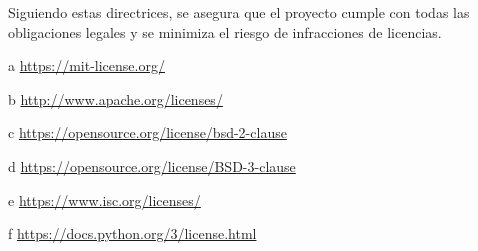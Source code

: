 Siguiendo estas directrices, se asegura que el proyecto cumple con todas las obligaciones legales y se minimiza el riesgo de infracciones de licencias.

\vspace{1cm}

\begin{ThreePartTable}
\renewcommand\TPTminimum{\textwidth}
\begin{TableNotes}
\footnotesize %
    \item[a] \url{https://mit-license.org/}
    \item[b] \url{http://www.apache.org/licenses/}
    \item[c] \url{https://opensource.org/license/bsd-2-clause}
    \item[d] \url{https://opensource.org/license/BSD-3-clause}
    \item[e] \url{https://www.isc.org/licenses/}
    \item[f] \url{https://docs.python.org/3/license.html}
\end{TableNotes}


\end{ThreePartTable}
